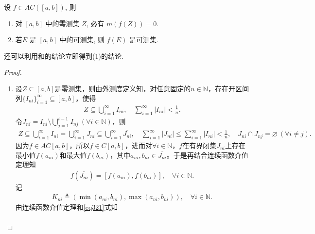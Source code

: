 \documentclass[../../main.tex]{subfiles}%
\begin{document}
\begin{proposition}\label{proposition:绝对连续函数零测集的像仍零测}
设 $f\in  AC([a,b])$, 则
\begin{enumerate}[(1)]
\item 对 $[a,b]$ 中的零测集 $Z$, 必有 $m(f(Z))=0$.

\item 若$E$ 是 $[a,b]$ 中的可测集, 则 $f(E)$ 是可测集.
\end{enumerate}
\end{proposition}
\begin{note}
还可以利用和的结论立即得到(1)的结论.
\end{note}
\begin{proof}
\begin{enumerate}[(1)]
\item 设$Z\subseteq [a,b]$是零测集，则由外测度定义知，对任意固定的$n\in \mathbb{N}$，存在开区间列$\{I_{ni}\}_{i=1}^{\infty}\subseteq [a,b]$，使得
\begin{align*}
Z\subseteq \bigcup\limits_{i=1}^{\infty}I_{ni},\quad \sum\limits_{i=1}^{\infty}|I_{ni}|<\frac{1}{n}.
\end{align*}
令$J_{ni}=I_{ni}\setminus \bigcup\limits_{j=1}^{i-1}I_{nj}\ (\forall i\in \mathbb{N})$，则
\begin{align}
Z\subseteq \bigcup\limits_{i=1}^{\infty}I_{ni}=\bigcup\limits_{i=1}^{\infty}J_{ni}\subseteq \bigcup\limits_{i=1}^{\infty}\overline{J_{ni}},\quad \sum\limits_{i=1}^{\infty}|J_{ni}|\leqslant \sum\limits_{i=1}^{\infty}|I_{ni}|<\frac{1}{n},\quad J_{ni}\cap J_{nj}=\varnothing\ (\forall i\neq j). \label{eq::::--234823urjreosew1}
\end{align}
因为$f\in AC[a,b]$，所以$f\in C[a,b]$，进而对$\forall i\in \mathbb{N}$，$f$在有界闭集$\overline{J_{ni}}$上存在最小值$f(a_{ni})$和最大值$f(b_{ni})$，其中$a_{ni},b_{ni}\in \overline{J_{ni}}$。于是再结合连续函数介值定理知
\begin{align}
f\left( \overline{J_{ni}} \right) =\left[ f\left( a_{ni} \right) ,f\left( b_{ni} \right) \right],\quad \forall i\in \mathbb{N}. \label{eq321}
\end{align}
记
\begin{align*}
K_{ni}\triangleq \left( \min \left( a_{ni},b_{ni} \right) ,\max \left( a_{ni},b_{ni} \right) \right),\quad \forall i\in \mathbb{N}.
\end{align*}
由连续函数介值定理和\eqref{eq321}式知
\begin{align*}

\end{align*}
\end{enumerate}
\end{proof}
\end{document}
